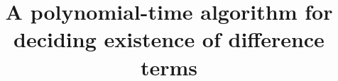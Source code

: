 \usepackage{inputs/macros}





\title[Existence of difference terms]{A polynomial-time algorithm for \\deciding existence of difference terms}

\address{Department of Mathematics\\
University of Hawaii\\Honolulu 96816\\USA}













\maketitle


